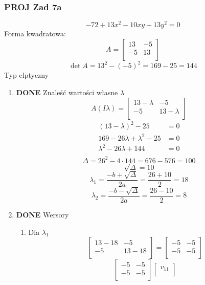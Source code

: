\documentclass[11pt]{article}
\begin{document}
\subsubsection{{\bfseries\sffamily PROJ} Zad 7a}
\label{sec:org84b71e8}
\[-72 + 13 x^{2} - 10xy + 13y^{2} = 0\]
Forma kwadratowa:
\[A = \begin{bmatrix}
        13 & -5\\
        -5 & 13\\
      \end{bmatrix}\]
\[\det A = 13^2 - {(-5)}^{2}
  = 169 - 25
  = 144\]
Typ elptyczny
\begin{enumerate}
\item {\bfseries\sffamily DONE} Znaleść wartości własne \(\lambda\)
\label{sec:orgbcc3e73}
\[A (I\lambda) = \begin{bmatrix}
        13 - \lambda & -5\\
        -5 & 13 - \lambda \\
      \end{bmatrix}\]
\begin{align*}
  {(13 - \lambda)}^{2} - 25 &= 0\\
  169 - 26 \lambda + {\lambda}^{2} - 25 &= 0 \\
  {\lambda}^{2} - 26 \lambda + 144 &= 0\\
\end{align*}
\[\Delta = 26^{2} - 4 \cdot 144 = 676 - 576 = 100\]
\[\sqrt{\Delta} = 10\]
\[\lambda_1 = \frac{-b + \sqrt{\Delta}}{2a}
= \frac{26 + 10}{2} = 18\]
\[\lambda_2 = \frac{-b - \sqrt{\Delta}}{2a}
= \frac{26 - 10}{2} = 8\]
\item {\bfseries\sffamily DONE} Wersory
\label{sec:orga7cd4b9}
\begin{enumerate}
\item Dla \(\lambda_1\)
\label{sec:org6e4dc2d}
\[\begin{bmatrix}
  13 - 18 & -5\\
  -5 & 13 - 18\\
\end{bmatrix}
=
\begin{bmatrix}
  -5 & -5\\
  -5 & -5\\
\end{bmatrix}\]
\[\begin{bmatrix}
    -5 & -5\\
    -5 & -5\\
  \end{bmatrix}
  \begin{bmatrix}
    v_{11}\\

\end{bmatrix}\]
\end{enumerate}
\end{enumerate}
\end{document}
